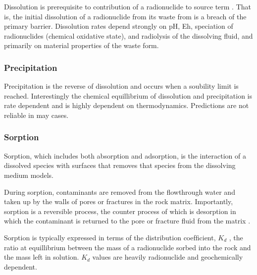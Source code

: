 Dissolution is prerequisite to contribution of a radionuclide to source term 
\cite{bracke_safety_2008}. That is, the initial 
dissolution of a radionuclide from its waste from is a breach of the primary
barrier. Dissolution rates depend strongly on pH, Eh,
speciation of radionuclides (chemical oxidative state), and radiolysis of the
dissolving fluid, and primarily on material properties of the waste form.


\subsubsection{Precipitation}

Precipitation is the reverse of dissolution and occurs when a soubility limit
is reached. Interestingly the chemical equillibrium of dissolution and
precipitation is rate dependent and is highly dependent on thermodynamics.
Predictions are not reliable in may cases.

\subsubsection{Sorption}

Sorption, which includes both absorption and adsorption,  is the interaction of a
dissolved species with surfaces that removes that species from the dissolving
medium models.

During sorption, contaminants are removed from the flowthrough water and taken up 
by the walls of pores or fractures in the rock matrix. Importantly, sorption is a 
reversible process, the  counter process of which is desorption in which the 
contaminant is returned to the pore or fracture fluid from the matrix 
 \cite{ahn_mass_1988} . 

Sorption is typically expressed in terms of the distribution coefﬁcient, $K_d$ , 
the ratio at equillibrium between the mass of a radionuclide sorbed into the 
rock and the mass left in solution. $K_d$ values are heavily radionuclide and 
geochemically dependent.  





